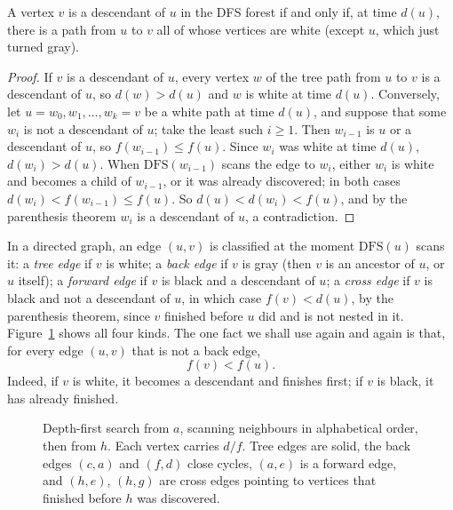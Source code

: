 \begin{theorem}\label{thm:whitepath}
A vertex $v$ is a descendant of $u$ in the DFS forest if and only if, at time $d(u)$, there is a path from $u$ to $v$ all of whose vertices are white (except $u$, which just turned gray).
\end{theorem}
\begin{proof}
If $v$ is a descendant of $u$, every vertex $w$ of the tree path from $u$ to $v$ is a descendant of $u$, so $d(w)>d(u)$ and $w$ is white at time $d(u)$. Conversely, let $u=w_0,w_1,\dots,w_k=v$
be a white path at time $d(u)$, and suppose that some $w_i$ is not a descendant of $u$; take the least such $i\ge1$. Then $w_{i-1}$ is $u$ or a descendant of $u$, so $f(w_{i-1})\le f(u)$. Since
$w_i$ was white at time $d(u)$, $d(w_i)>d(u)$. When $\mathrm{DFS}(w_{i-1})$ scans the edge to $w_i$, either $w_i$ is white and becomes a child of $w_{i-1}$, or it was already discovered; in both
cases $d(w_i)<f(w_{i-1})\le f(u)$. So $d(u)<d(w_i)<f(u)$, and by the parenthesis theorem $w_i$ is a descendant of $u$, a contradiction.
\end{proof}

In a directed graph, an edge $(u,v)$ is classified at the moment $\mathrm{DFS}(u)$ scans it: a \emph{tree edge} if $v$ is white; a \emph{back edge} if $v$ is gray (then $v$ is an ancestor of $u$, or $u$ itself);
a \emph{forward edge} if $v$ is black and a descendant of $u$; a \emph{cross edge} if $v$ is black and not a descendant of $u$, in which case $f(v)<d(u)$, by the parenthesis theorem, since $v$ finished
before $u$ did and is not nested in it. Figure~\ref{fig:dfs} shows all four kinds. The one fact we shall use again and again is that, for every edge $(u,v)$ that is not a back edge,
\begin{equation}\label{eq:finish}
f(v)<f(u).
\end{equation}
Indeed, if $v$ is white, it becomes a descendant and finishes first; if $v$ is black, it has already finished.

\begin{figure}[ht]
\centering
{}
\caption{Depth-first search from $a$, scanning neighbours in alphabetical order, then from $h$. Each vertex carries $d/f$. Tree edges are solid, the back edges $(c,a)$ and $(f,d)$
close cycles, $(a,e)$ is a forward edge, and $(h,e)$, $(h,g)$ are cross edges pointing to vertices that finished before $h$ was discovered.}
\label{fig:dfs}
\end{figure}

